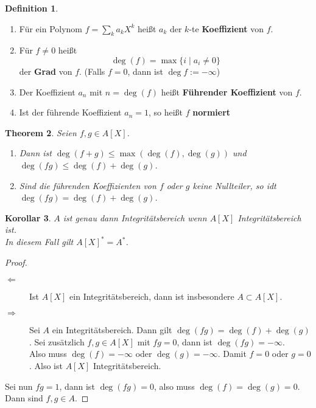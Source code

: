 \documentclass[10pt,a4paper]{article}
\theoremstyle{plain}
\newtheorem{theorem}{Theorem}[section]
\newtheorem{kor}[theorem]{Korollar}
\theoremstyle{definition}
\newtheorem{definition}[theorem]{Definition}
\theoremstyle{remark}
\begin{document}
	\begin{definition}
		\begin{enumerate}
			\item Für ein Polynom $f=\sum_ka_kX^k$ heißt $a_k$ der $k$-te \textbf{Koeffizient} von $f$.
			\item Für $f\neq0$ heißt
			\[\deg(f)=\max\{i\mid a_i\neq 0\}\]
			der \textbf{Grad} von $f$. (Falls $f=0$, dann ist $\deg f:=-\infty$)
			\item Der Koeffizient $a_n$ mit $n=\deg(f)$ heißt \textbf{Führender Koeffizient} von $f$.
			\item Ist der führende Koeffizient $a_n=1$, so heißt $f$ \textbf{normiert}
		\end{enumerate}
	\end{definition}

	\begin{theorem}
		Seien $f,g\in A[X]$. \begin{enumerate}
			\item Dann ist $\deg(f+g)\leq\max(\deg (f),\deg (g))$ und $\deg(fg)\leq\deg(f)+\deg(g)$.\\
			\item Sind die führenden Koeffizienten von $f$ oder $g$ keine Nullteiler, so idt $\deg(fg)=\deg(f)+\deg (g)$.
		\end{enumerate}
	\end{theorem}

	\begin{kor}
		$A$ ist genau dann Integritätsbereich wenn $A[X]$ Integritätsbereich ist.\\
		In diesem Fall gilt $A[X]^*=A^*$.
	\end{kor}
	\begin{proof}
		\begin{description}
			\item[$\Leftarrow$] Ist $A[X]$ ein Integritätsbereich, dann ist insbesondere $A\subset A[X]$.
			\item[$\Rightarrow$] Sei $A$ ein Integritätsbereich. Dann gilt $\deg(fg)=\deg(f)+\deg(g)$. Sei zusätzlich $f,g\in A[X]$ mit $fg=0$, dann ist $\deg(fg)=-\infty$.\\
			Also muss $\deg(f)=-\infty$ oder $\deg(g)=-\infty$. Damit $f=0$ oder $g=0$. Also ist $A[X]$ Integritätsbereich.
		\end{description}
		Sei nun $fg=1$, dann ist $\deg(fg)=0$, also muss $\deg(f)=\deg(g)=0$. Dann sind $f,g\in A$.
	\end{proof}

	
\end{document}
